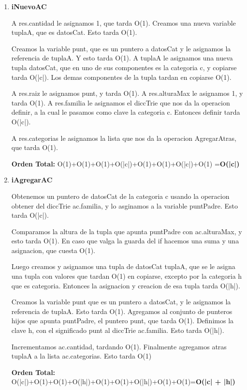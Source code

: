 \begin{enumerate}
\item\textbf{iNuevoAC}
\par A res.cantidad le asignamos 1, que tarda O(1). Creamos una nueva variable tuplaA, que es datosCat. Esto tarda O(1).
\par Creamos la variable punt, que es un puntero a datosCat y le asignamos la referencia de tuplaA. Y esto tarda O(1). A tuplaA le asignamos una nueva tupla datosCat, que en uno de sus componentes es la categoria c, y copiarse tarda O(|c|). Los demas componentes de la tupla tardan en copiarse O(1).
\par A res.raiz le asignamos punt, y tarda O(1). A res.alturaMax le asignamos 1, y tarda O(1). A res.familia le asignamos el diccTrie que nos da la operacion definir, a la cual le pasamos como clave la categoria c. Entonces definir tarda O(|c|).
\par A res.categorias le asignamos la lista que nos da la operacion AgregarAtras, que tarda O(1).
\par \textbf{Orden Total:} O(1)+O(1)+O(1)+O(|c|)+O(1)+O(1)+O(|c|)+O(1) =\textbf{O(|c|)}

\item\textbf{iAgregarAC}
\par Obtenemos un puntero de datosCat de la categoria c usando la operacion obtener del diccTrie ac.familia, y lo asginamos a la variable puntPadre. Esto tarda O(|c|).
\par Comparamos la altura de la tupla que apunta puntPadre con ac.alturaMax, y esto tarda O(1). En caso que valga la guarda del if hacemos una suma y una asignacion, que cuesta O(1).
\par Luego creamos y asignamos una tupla de datosCat tuplaA, que se le asigna una tupla con valores que tardan O(1) en copiarse, excepto por la categoria h que es categoria. Entonces la asignacion y creacion de esa tupla tarda O(|h|).
\par Creamos la variable punt que es un puntero a datosCat, y le asignamos la referencia de tuplaA. Esto tarda O(1). Agregamos al conjunto de punteros hijos que apunta puntPadre, el puntero punt, que tarda O(1). Definimos la clave h, con el significado punt al diccTrie ac.familia. Esto tarda O(|h|).
\par Incrementamos ac.cantidad, tardando O(1). Finalmente agregamos atras tuplaA a la lista ac.categorias. Esto tarda O(1)
\par \textbf{Orden Total:} O(|c|)+O(1)+O(1)+O(|h|)+O(1)+O(1)+O(|h|)+O(1)+O(1)=\textbf{O(|c| + |h|)}


\end{enumerate}
